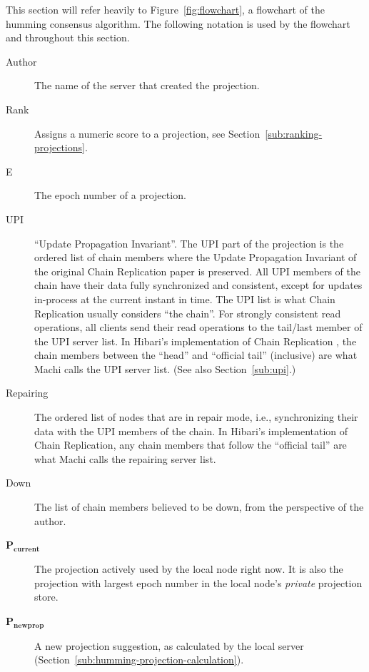 \documentclass[preprint,10pt]{sigplanconf}
\begin{document}
This section will refer heavily to Figure~\ref{fig:flowchart}, a
flowchart of the humming consensus algorithm.  The following notation
is used by the flowchart and throughout this section.

\begin{description}
\item[Author] The name of the server that created the projection.

\item[Rank] Assigns a numeric score to a projection, see
  Section~\ref{sub:ranking-projections}.

\item[E] The epoch number of a projection.

\item[UPI] ``Update Propagation Invariant''.  The UPI part of the projection
  is the ordered list of chain members where the
  Update Propagation Invariant of the original Chain Replication paper
  \cite{chain-replication} is preserved.  
  All UPI  members of the chain have their data fully synchronized and
  consistent, except for updates in-process at the current instant in time.
  The UPI list is what Chain Replication usually considers ``the
  chain''.  For strongly consistent read operations, all clients
  send their read operations to the tail/last member of the UPI server
  list.
  In Hibari's implementation of Chain Replication
  \cite{cr-theory-and-practice}, the chain members between the
  ``head'' and ``official tail'' (inclusive) are what Machi calls the
  UPI server list.  (See also Section~\ref{sub:upi}.)

\item[Repairing] The ordered list of nodes that are in repair mode,
  i.e., synchronizing their data with the UPI members of the chain.
  In Hibari's implementation of Chain Replication, any chain members
  that follow the ``official tail'' are what Machi calls the repairing
  server list.

\item[Down] The list of chain members believed to be down, from the
  perspective of the author.

\item[$\mathbf{P_{current}}$] The projection actively used by the local
  node right now.  It is also the projection with largest
  epoch number in the local node's {\em private} projection store.

\item[$\mathbf{P_{newprop}}$] A new projection suggestion, as
  calculated by the local server
  (Section~\ref{sub:humming-projection-calculation}).


\end{description}
\end{document}
